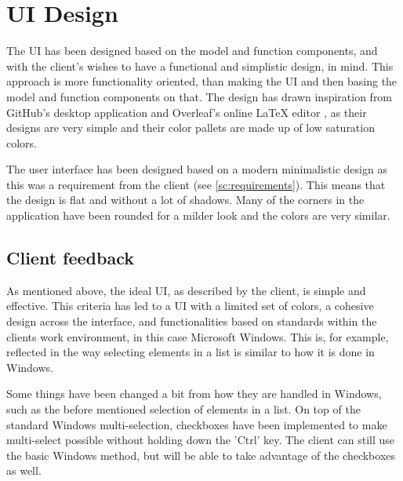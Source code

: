 \chapter{UI Design} \label{ch:ui_design}
The UI has been designed based on the model and function components, and with the client's wishes to have a functional and simplistic design, in mind. This approach is more functionality oriented, than making the UI and then basing the model and function components on that. The design has drawn inspiration from GitHub's \citep{GithubDesktop} desktop application and Overleaf's online LaTeX editor \citep{Overleaf}, as their designs are very simple and their color pallets are made up of low saturation colors. 
\par

The user interface has been designed based on a modern minimalistic design \citep{MinimalistUX} as this was a requirement from the client (see \autoref{sc:requirements}). This means that the design is flat and without a lot of shadows. Many of the corners in the application have been rounded for a milder look and the colors are very similar.

\section{Client feedback}
As mentioned above, the ideal UI, as described by the client, is simple and effective. This criteria has led to a UI with a limited set of colors, a cohesive design across the interface, and functionalities based on standards within the clients work environment, in this case Microsoft Windows. This is, for example, reflected in the way selecting elements in a list is similar to how it is done in Windows.
\par
Some things have been changed a bit from how they are handled in Windows, such as the before mentioned selection of elements in a list. On top of the standard Windows multi-selection, checkboxes have been implemented to make multi-select possible without holding down the 'Ctrl' key. The client can still use the basic Windows method, but will be able to take advantage of the checkboxes as well.

